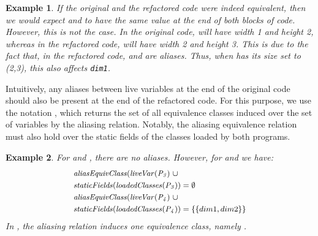 \documentclass[sigconf]{acmart}
\newtheorem{example}{Example}
\begin{document}
\begin{example}
If the original and the refactored code were indeed equivalent,
then we would expect  and  to have the same value at the end of both blocks of code.
However, this is not the case.
In the original code,  will have width 1 and height 2, whereas in the refactored code,
 will have width 2 and height 3. This is due to the fact that,
in the refactored code,  and  are aliases. %
Thus, when  has its size set to (2,3), this also affects \lstinline[breaklines=true]{dim1}.
\end{example}

Intuitively, any aliases between live variables at the end of the original code should also
be present at the end of the refactored code. For this purpose, we use the notation
, which returns the set of all equivalence classes induced over the
set of variables  by the aliasing relation.
Notably, the aliasing equivalence relation must also hold over the
static fields of the classes loaded by both programs.


\begin{example}
For  and , there are no aliases.
%
However, for  and  we have:
\[
\small
\begin{aligned}[t]
  &\mathit{{aliasEquivClass(liveVar(P_3)}}~ \cup\\
  &\mathit{{staticFields(loadedClasses(P_3))}} = \emptyset\\
  &\mathit{{aliasEquivClass(liveVar(P_4)}} ~\cup\\
  &\mathit{{staticFields(loadedClasses(P_4))}} = \{\{dim1, dim2\}\}
\end{aligned}
\]
In , the aliasing relation induces one equivalence class, namely .

\end{example}
\end{document}
